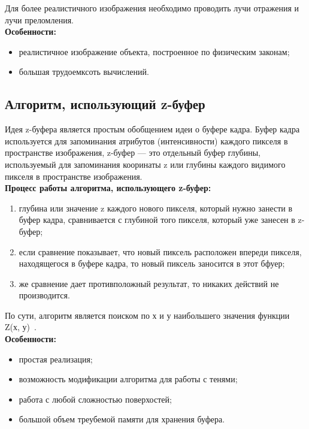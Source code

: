 Для более реалистичного изображения необходимо проводить лучи отражения и лучи преломления.\\

\clearpage
\textbf{Особенности:}
\begin{itemize}
    \item реалистичное изображение объекта, построенное по физическим законам;
    \item большая трудоемксоть вычислений.
\end{itemize}

\subsection{Алгоритм, использующий z-буфер}

Идея z-буфера является простым обобщением идеи о буфере кадра. 
Буфер кадра используется для запоминания атрибутов (интенсивности) каждого пикселя в пространстве изображения, z-буфер ---
это отдельный буфер глубины, используемый для запоминания кооринаты z или
глубины каждого видимого пикселя в пространстве изображения. \\

\textbf{Процесс работы алгоритма, использующего z-буфер:}

\begin{enumerate}
    \item глубина или значение z каждого нового пикселя, который нужно занести в буфер кадра, сравнивается с глубиной того пикселя,
    который уже занесен в z-буфер;
    \item если сравнение показывает, что новый пиксель расположен впереди пикселя,
    находящегося в буфере кадра, то новый пиксель заносится в этот бфуер;
    \item же сравнение дает противположный результат, то никаких действий не производится.
\end{enumerate}

По сути, алгоритм является поиском по х и у наибольшего значения функции Z(х, у)~\cite{tpu}.\\

\textbf{Особенности:}
\begin{itemize}
    \item простая реализация;
    \item возможность модификации алгоритма для работы с тенями;
    \item работа с любой сложностью поверхостей;
    \item большой объем треубемой памяти для хранения буфера.
\end{itemize}

